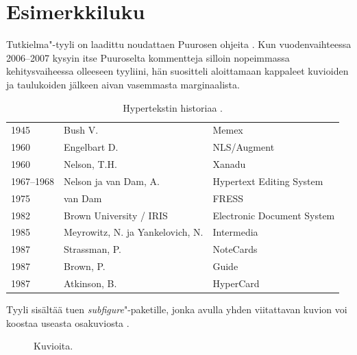 \chapter{Esimerkkiluku}

Tutkielma"-tyyli on laadittu noudattaen Puurosen ohjeita \citep{Puuronen2002Ohjeita-tutkimusraportin-kirjoittajalle}. Kun vuodenvaihteessa 2006--2007 kysyin itse Puuroselta kommentteja silloin nopeimmassa kehitysvaiheessa olleeseen tyyliini, hän suositteli aloittamaan kappaleet kuvioiden  ja taulukoiden  jälkeen aivan vasemmasta marginaalista.

\begin{table}[h!]
\caption{Hypertekstin historiaa \citep[6--9]{Heimburg1989Hyperjarjestelmat}.}
\centering
\begin{tabular}{lll}
    1945        & Bush V.                   & Memex                     \\
    1960        & Engelbart D.              & NLS/Augment               \\
    1960        & Nelson, T.H.              & Xanadu                    \\
    1967--1968  & Nelson ja van Dam, A.       & Hypertext Editing System  \\
    1975        & van Dam                   & FRESS                     \\
    1982        & Brown University / IRIS   & Electronic Document System\\
    1985        & Meyrowitz, N. ja Yankelovich, N. & Intermedia          \\
    1987        & Strassman, P.             & NoteCards                 \\
    1987        & Brown, P.                 & Guide                     \\
    1987        & Atkinson, B.              & HyperCard                 \\
\end{tabular}
\label{tbl:Hypertekstin-historiaa}
\end{table}

\noindent Tyyli sisältää tuen \emph{subfigure}"-paketille, jonka avulla yhden viitattavan kuvion  voi koostaa useasta osakuviosta .

\begin{figure}[h]
\hspace{0.75cm}
\caption{Kuvioita.}
\label{fig:Kuvioita}
\end{figure}
